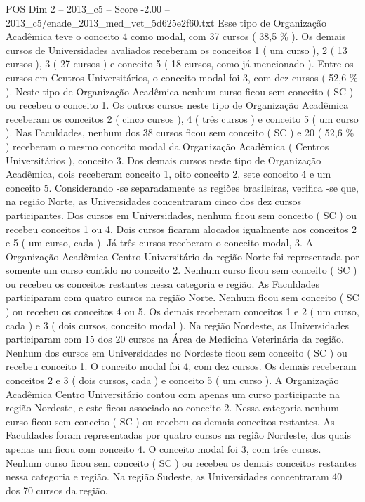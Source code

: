 \begin{textsample}{POS Dim 2 – 2013\_c5 – Score -2.00 – 2013\_c5/enade\_2013\_med\_vet\_5d625e2f60.txt}
Esse tipo de Organização Acadêmica teve o conceito 4 como modal, com 37 cursos ( 38,5 \% ).
Os demais cursos de Universidades avaliados receberam os conceitos 1 ( um curso ), 2 ( 13 cursos ), 3 ( 27 cursos ) e conceito 5 ( 18 cursos, como já mencionado ).
Entre os cursos em Centros Universitários, o conceito modal foi 3, com dez cursos ( 52,6 \% ).
Neste tipo de Organização Acadêmica nenhum curso ficou sem conceito ( SC ) ou recebeu o conceito 1.
Os outros cursos neste tipo de Organização Acadêmica receberam os conceitos 2 ( cinco cursos ), 4 ( três cursos ) e conceito 5 ( um curso ).
Nas Faculdades, nenhum dos 38 cursos ficou sem conceito ( SC ) e 20 ( 52,6 \% ) receberam o mesmo conceito modal da Organização Acadêmica ( Centros Universitários ), conceito 3.
Dos demais cursos neste tipo de Organização Acadêmica, dois receberam conceito 1, oito conceito 2, sete conceito 4 e um conceito 5.
Considerando -se separadamente as regiões brasileiras, verifica -se que, na região Norte, as Universidades concentraram cinco dos dez cursos participantes.
Dos cursos em Universidades, nenhum ficou sem conceito ( SC ) ou recebeu conceitos 1 ou 4.
Dois cursos ficaram alocados igualmente aos conceitos 2 e 5 ( um curso, cada ).
Já três cursos receberam o conceito modal, 3.
A Organização Acadêmica Centro Universitário da região Norte foi representada por somente um curso contido no conceito 2.
Nenhum curso ficou sem conceito ( SC ) ou recebeu os conceitos restantes nessa categoria e região.
As Faculdades participaram com quatro cursos na região Norte.
Nenhum ficou sem conceito ( SC ) ou recebeu os conceitos 4 ou 5.
Os demais receberam conceitos 1 e 2 ( um curso, cada ) e 3 ( dois cursos, conceito modal ).
Na região Nordeste, as Universidades participaram com 15 dos 20 cursos na Área de Medicina Veterinária da região.
Nenhum dos cursos em Universidades no Nordeste ficou sem conceito ( SC ) ou recebeu conceito 1.
O conceito modal foi 4, com dez cursos.
Os demais receberam conceitos 2 e 3 ( dois cursos, cada ) e conceito 5 ( um curso ).
A Organização Acadêmica Centro Universitário contou com apenas um curso participante na região Nordeste, e este ficou associado ao conceito 2.
Nessa categoria nenhum curso ficou sem conceito ( SC ) ou recebeu os demais conceitos restantes.
As Faculdades foram representadas por quatro cursos na região Nordeste, dos quais apenas um ficou com conceito 4.
O conceito modal foi 3, com três cursos.
Nenhum curso ficou sem conceito ( SC ) ou recebeu os demais conceitos restantes nessa categoria e região.
Na região Sudeste, as Universidades concentraram 40 dos 70 cursos da região.

\end{textsample}
